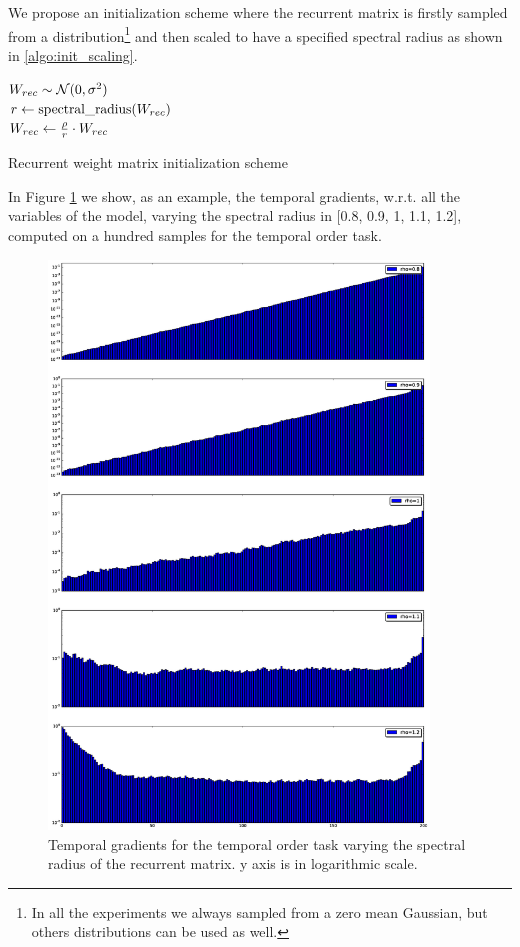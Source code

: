 We propose an initialization scheme where the recurrent matrix is firstly sampled from a distribution\footnote{In all the experiments we always sampled from a zero mean Gaussian, but others distributions can be used as well.} and then scaled to have a specified spectral radius as shown in \ref{algo:init_scaling}.

\begin{algorithm}[!h]
	\BlankLine

	$W_{rec} \sim \mathcal{N}(0, \sigma^2)$\\
	$r \gets \mbox{spectral\_radius}(W_{rec})$\\
	$W_{rec}\gets \frac{\rho}{r} \cdot W_{rec}$\\
	\caption{Recurrent weight matrix initialization scheme}
	\label{algo:init_scaling}
\end{algorithm}

 In Figure \ref{fig:temporal_norms} we show, as an example, the temporal gradients, w.r.t. all the variables of the model, varying the spectral radius in [0.8, 0.9, 1, 1.1, 1.2], computed on a hundred samples for the temporal order task.

\begin{figure}
    \includegraphics[width=0.9\textwidth]{chapter3/temporal_components.eps}
    \caption{Temporal gradients for the temporal order task varying the spectral radius of the recurrent matrix. y axis is in logarithmic scale.}
    \label{fig:temporal_norms}
\end{figure}

